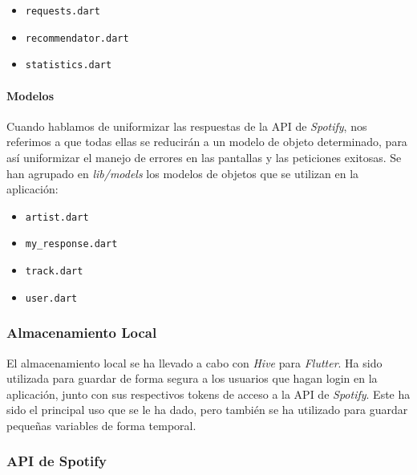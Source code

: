 \begin{itemize}
  \item \texttt{requests.dart}
  \item \texttt{recommendator.dart}
  \item \texttt{statistics.dart}
\end{itemize}


\paragraph{Modelos}

Cuando hablamos de uniformizar las respuestas de la API de \textit{Spotify}, nos referimos a que todas ellas se reducirán a un modelo de objeto determinado, para así uniformizar el manejo de
errores en las pantallas y las peticiones exitosas. Se han agrupado en \textit{lib/models} los modelos de objetos que se utilizan en la aplicación:

\begin{itemize}
  \item \texttt{artist.dart}
  \item \texttt{my\_response.dart}
  \item \texttt{track.dart}
  \item \texttt{user.dart}
\end{itemize}



\subsubsection{Almacenamiento Local\label{subsec:almacenamiento_local}}

El almacenamiento local se ha llevado a cabo con \textit{Hive} \cite{hive} para \textit{Flutter}. Ha sido utilizada
para guardar de forma segura a los usuarios que hagan login en la aplicación, junto con sus respectivos tokens de
 acceso a la API de \textit{Spotify}. Este ha sido el principal uso que se le ha dado, pero también se ha utilizado 
 para guardar pequeñas variables de forma temporal.




\subsubsection{API de Spotify\label{subsec:api_spotify_diseno}}

